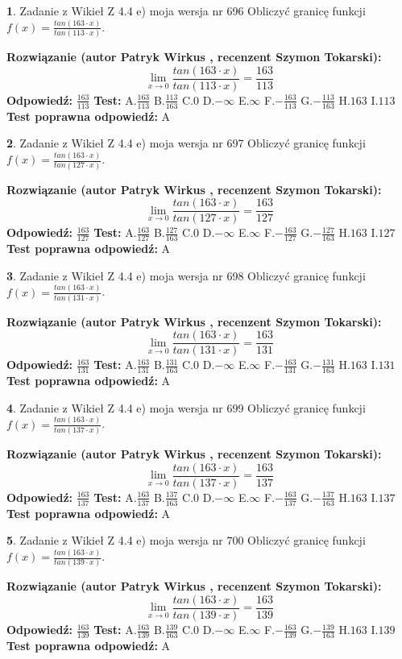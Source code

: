 \documentclass[12pt, a4paper]{article}
\theoremstyle{definition} %
\newtheorem{zad}{}
\newcommand{\zadStart}[1]{\begin{zad}#1\newline}
\newcommand{\zadStop}{\end{zad}}
\newcommand{\rozwStart}[2]{\noindent \textbf{Rozwiązanie (autor #1 , recenzent #2): }\newline}
\newcommand{\rozwStop}{\newline}
\newcommand{\odpStart}{\noindent \textbf{Odpowiedź:}\newline}
\newcommand{\odpStop}{\newline}
\newcommand{\testStart}{\noindent \textbf{Test:}\newline}
\newcommand{\testStop}{\newline}
\newcommand{\kluczStart}{\noindent \textbf{Test poprawna odpowiedź:}\newline}
\newcommand{\kluczStop}{\newline}
\begin{document}
\zadStart{Zadanie z Wikieł Z 4.4 e) moja wersja nr 696}
Obliczyć granicę funkcji $f(x)=\frac{tan(163\cdot x)}{tan(113\cdot x)}$.
\zadStop
\rozwStart{Patryk Wirkus}{Szymon Tokarski}
$$\lim\limits_{x\to 0}\frac{tan(163\cdot x)}{tan(113\cdot x)}=
\frac{163}{113}$$
\rozwStop
\odpStart
$\frac{163}{113}$
\odpStop
\testStart
A.$\frac{163}{113}$
B.$\frac{113}{163}$
C.$0$
D.$-\infty$
E.$\infty$
F.$-\frac{163}{113}$
G.$-\frac{113}{163}$
H.$163$
I.$113$
\testStop
\kluczStart
A
\kluczStop



\zadStart{Zadanie z Wikieł Z 4.4 e) moja wersja nr 697}
Obliczyć granicę funkcji $f(x)=\frac{tan(163\cdot x)}{tan(127\cdot x)}$.
\zadStop
\rozwStart{Patryk Wirkus}{Szymon Tokarski}
$$\lim\limits_{x\to 0}\frac{tan(163\cdot x)}{tan(127\cdot x)}=
\frac{163}{127}$$
\rozwStop
\odpStart
$\frac{163}{127}$
\odpStop
\testStart
A.$\frac{163}{127}$
B.$\frac{127}{163}$
C.$0$
D.$-\infty$
E.$\infty$
F.$-\frac{163}{127}$
G.$-\frac{127}{163}$
H.$163$
I.$127$
\testStop
\kluczStart
A
\kluczStop



\zadStart{Zadanie z Wikieł Z 4.4 e) moja wersja nr 698}
Obliczyć granicę funkcji $f(x)=\frac{tan(163\cdot x)}{tan(131\cdot x)}$.
\zadStop
\rozwStart{Patryk Wirkus}{Szymon Tokarski}
$$\lim\limits_{x\to 0}\frac{tan(163\cdot x)}{tan(131\cdot x)}=
\frac{163}{131}$$
\rozwStop
\odpStart
$\frac{163}{131}$
\odpStop
\testStart
A.$\frac{163}{131}$
B.$\frac{131}{163}$
C.$0$
D.$-\infty$
E.$\infty$
F.$-\frac{163}{131}$
G.$-\frac{131}{163}$
H.$163$
I.$131$
\testStop
\kluczStart
A
\kluczStop



\zadStart{Zadanie z Wikieł Z 4.4 e) moja wersja nr 699}
Obliczyć granicę funkcji $f(x)=\frac{tan(163\cdot x)}{tan(137\cdot x)}$.
\zadStop
\rozwStart{Patryk Wirkus}{Szymon Tokarski}
$$\lim\limits_{x\to 0}\frac{tan(163\cdot x)}{tan(137\cdot x)}=
\frac{163}{137}$$
\rozwStop
\odpStart
$\frac{163}{137}$
\odpStop
\testStart
A.$\frac{163}{137}$
B.$\frac{137}{163}$
C.$0$
D.$-\infty$
E.$\infty$
F.$-\frac{163}{137}$
G.$-\frac{137}{163}$
H.$163$
I.$137$
\testStop
\kluczStart
A
\kluczStop



\zadStart{Zadanie z Wikieł Z 4.4 e) moja wersja nr 700}
Obliczyć granicę funkcji $f(x)=\frac{tan(163\cdot x)}{tan(139\cdot x)}$.
\zadStop
\rozwStart{Patryk Wirkus}{Szymon Tokarski}
$$\lim\limits_{x\to 0}\frac{tan(163\cdot x)}{tan(139\cdot x)}=
\frac{163}{139}$$
\rozwStop
\odpStart
$\frac{163}{139}$
\odpStop
\testStart
A.$\frac{163}{139}$
B.$\frac{139}{163}$
C.$0$
D.$-\infty$
E.$\infty$
F.$-\frac{163}{139}$
G.$-\frac{139}{163}$
H.$163$
I.$139$
\testStop
\kluczStart
A
\kluczStop
\end{document}
